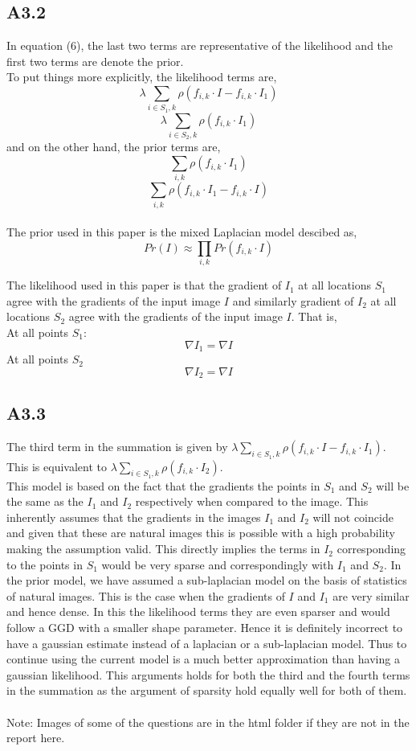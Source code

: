 \documentclass{article}
\begin{document}
\subsection*{A3.2}
In equation (6), the last two terms are representative of the likelihood and the first two terms are denote the prior. \\
To put things more explicitly, the likelihood terms are, 
$$\lambda \sum_{i \in S_1,k} \rho(f_{i,k}\cdot I - f_{i,k}\cdot I_1)$$
$$\lambda \sum_{i \in S_2,k} \rho(f_{i,k}\cdot I_1)$$
and on the other hand, the prior terms are,
$$\sum_{i,k} \rho (f_{i,k}\cdot I_1)$$
$$\sum_{i,k} \rho(f_{i,k} \cdot I_1 - f_{i,k} \cdot I)$$ \\

The prior used in this paper is the mixed Laplacian model descibed as, 
$$Pr(I) \approx \prod_{i,k}Pr(f_{i,k} \cdot I)$$


The likelihood used in this paper is that the gradient of $I_1$ at all locations $S_1$ agree with the gradients of the input image $I$
and similarly gradient of $I_2$ at all locations $S_2$ agree with the gradients of the input image $I$. That is,\\
At all points $S_1$:
$$\nabla I_1 = \nabla I$$
At all points $S_2$
$$\nabla I_2 = \nabla I$$


\subsection*{A3.3}
The third term in the summation is given by $\lambda \sum_{i \in S_1,k} \rho(f_{i,k}\cdot I - f_{i,k}\cdot I_1)$. This is equivalent to $\lambda \sum_{i \in S_1,k} \rho(f_{i,k}\cdot I_2)$. \\

This model is based on the fact that the gradients the points in $S_1$ and $S_2$ will be the same as the $I_1$ and $I_2$ respectively when compared to the image. This inherently assumes that the gradients in the images $I_1$ and $I_2$ will not coincide and given that these are natural images this is possible with a high probability making the assumption valid. This directly implies the terms in $I_2$ corresponding to the points in $S_1$ would be very sparse and correspondingly with $I_1$ and $S_2$. In the prior model, we have assumed a sub-laplacian model on the basis of statistics of natural images. This is the case when the gradients of $I$ and  $I_1$ are very similar and hence dense. In this the likelihood terms they are even sparser and would follow a GGD with a smaller shape parameter. Hence it is definitely incorrect to have a gaussian estimate instead of a laplacian or a sub-laplacian model. Thus to continue using the current model is a much better approximation than having a gaussian likelihood. This arguments holds for both the third and the fourth terms in the summation as the argument of sparsity hold equally well for both of them. \\ \\


Note: Images of some of the questions are in the html folder if they are not in the report here.
\end{document}
